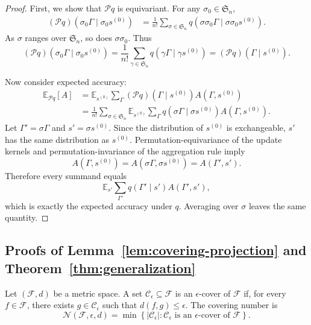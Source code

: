 \begin{proof}
    
First, we show that $\mathcal Pq$ is equivariant. For any
$\sigma_0\in\mathfrak S_n$,
\[
\begin{aligned}
    (\mathcal Pq)(\sigma_0\Gamma\mid \sigma_0s^{(0)})
    &=
    \frac{1}{n!}
    \sum_{\sigma\in\mathfrak S_n}
    q(\sigma\sigma_0\Gamma\mid \sigma\sigma_0s^{(0)}).
\end{aligned}
\]
As $\sigma$ ranges over $\mathfrak S_n$, so does $\sigma\sigma_0$. Thus
\[
    (\mathcal Pq)(\sigma_0\Gamma\mid \sigma_0s^{(0)})
    =
    \frac{1}{n!}
    \sum_{\gamma\in\mathfrak S_n}
    q(\gamma\Gamma\mid \gamma s^{(0)})
    =
    (\mathcal Pq)(\Gamma\mid s^{(0)}).
\]

Now consider expected accuracy:
\[
\begin{aligned}
    \mathbb E_{\mathcal Pq}[A]
    &=
    \mathbb E_{s^{(0)}}
    \sum_\Gamma
    (\mathcal Pq)(\Gamma\mid s^{(0)})A(\Gamma,s^{(0)})\\
    &=
    \frac{1}{n!}
    \sum_{\sigma\in\mathfrak S_n}
    \mathbb E_{s^{(0)}}
    \sum_\Gamma
    q(\sigma\Gamma\mid \sigma s^{(0)})A(\Gamma,s^{(0)}).
\end{aligned}
\]
Let $\Gamma'=\sigma\Gamma$ and $s'=\sigma s^{(0)}$. Since the distribution of
$s^{(0)}$ is exchangeable, $s'$ has the same distribution as $s^{(0)}$.
Permutation-equivariance of the update kernels and permutation-invariance of
the aggregation rule imply
\[
    A(\Gamma,s^{(0)})
    =
    A(\sigma\Gamma,\sigma s^{(0)})
    =
    A(\Gamma',s').
\]
Therefore every summand equals
\[
    \mathbb E_{s'}
    \sum_{\Gamma'}
    q(\Gamma'\mid s')A(\Gamma',s'),
\]
which is exactly the expected accuracy under $q$. Averaging over $\sigma$ leaves
the same quantity. 
\end{proof}


\subsection{Proofs of Lemma~\ref{lem:covering-projection} and Theorem~\ref{thm:generalization}}
\label{app:complexity}

\begin{definition}
\label{def:covering-number}
Let $(\mathcal F,d)$ be a metric space. A set
$\mathcal C_\epsilon\subseteq \mathcal F$ is an $\epsilon$-cover of
$\mathcal F$ if, for every $f\in\mathcal F$, there exists
$g\in\mathcal C_\epsilon$ such that $d(f,g)\le \epsilon$. The covering number is
\[
    \mathcal N(\mathcal F,\epsilon,d)
    =
    \min\left\{
    |\mathcal C_\epsilon|:
    \mathcal C_\epsilon
    \text{ is an } \epsilon\text{-cover of } \mathcal F
    \right\}.
\]
\end{definition}

